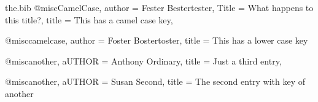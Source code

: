 \begin{filecontents}[overwrite]{the.bib}
@misc{CamelCase,
  author = {Fester Bestertester},
  Title = {What happens to this title?},
  title = {This has a camel case key},
}

@misc{camelcase,
  author = {Foster Bostertoster},
  title = {This has a lower case key}
}

@misc{another, 
 aUTHOR = {Anthony Ordinary},
 title = {Just a third entry},
}

@misc{another,
  aUTHOR = {Susan Second},
  title = {The second entry with key of another}
}
\end{filecontents}
\documentclass{article}
\usepackage{biblatex}
\usepackage{hyperref}

I don't have much to say.
\cite{camelcase} and \cite{CamelCase} and \cite{another}.

